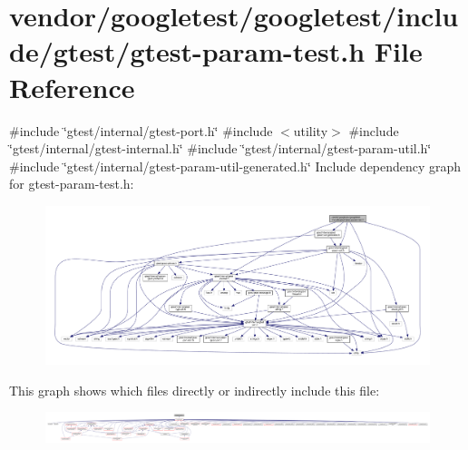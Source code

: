 \hypertarget{gtest-param-test_8h}{}\section{vendor/googletest/googletest/include/gtest/gtest-\/param-\/test.h File Reference}
\label{gtest-param-test_8h}
{\ttfamily \#include \char`\"{}gtest/internal/gtest-\/port.\+h\char`\"{}}\newline
{\ttfamily \#include $<$utility$>$}\newline
{\ttfamily \#include \char`\"{}gtest/internal/gtest-\/internal.\+h\char`\"{}}\newline
{\ttfamily \#include \char`\"{}gtest/internal/gtest-\/param-\/util.\+h\char`\"{}}\newline
{\ttfamily \#include \char`\"{}gtest/internal/gtest-\/param-\/util-\/generated.\+h\char`\"{}}\newline
Include dependency graph for gtest-\/param-\/test.h\+:
\nopagebreak
\begin{figure}[H]
\begin{center}
\leavevmode
\includegraphics[width=350pt]{gtest-param-test_8h__incl}
\end{center}
\end{figure}
This graph shows which files directly or indirectly include this file\+:
\nopagebreak
\begin{figure}[H]
\begin{center}
\leavevmode
\includegraphics[width=350pt]{gtest-param-test_8h__dep__incl}
\end{center}
\end{figure}
